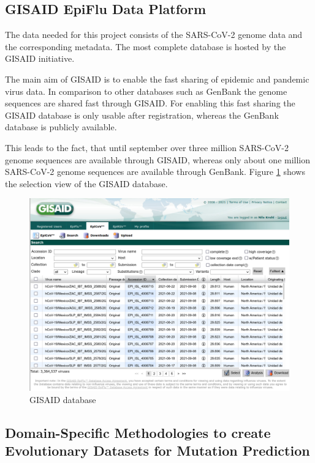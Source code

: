 \subsection{GISAID EpiFlu Data Platform} \label{fundamentalsB}

The data needed for this project consists of the \ac{SARS-CoV-2} genome data and the corresponding metadata. The most complete database is hosted by the \ac{GISAID} initiative. \cite{Gisaid2021}

The main aim of \ac{GISAID} is to enable the fast sharing of epidemic and pandemic virus data. In comparison to other databases such as GenBank the genome sequences are shared fast through \ac{GISAID}. For enabling this fast sharing the \ac{GISAID} database is only usable after registration, whereas the GenBank database is publicly available. \cite{shuGISAIDGlobalInitiative2017}

This leads to the fact, that until september over three million \ac{SARS-CoV-2} genome sequences are available through \ac{GISAID}, whereas only about one million \ac{SARS-CoV-2} genome sequences are available through GenBank. Figure \ref{gisaid} shows the selection view of the \ac{GISAID} database. \cite{nationallibraryofmedicinencbieditorNCBISARSCoV2Resources, gisaideditorGISAID2021}

\begin{figure}[ht]
	\centering
	\includegraphics[width=1.0\linewidth]{figures/gisaid.png}
	\caption{\ac{GISAID} database}
	\label{gisaid}
\end{figure}


\subsection{Domain-Specific Methodologies to create Evolutionary Datasets for Mutation Prediction} \label{fundamentalsC}

